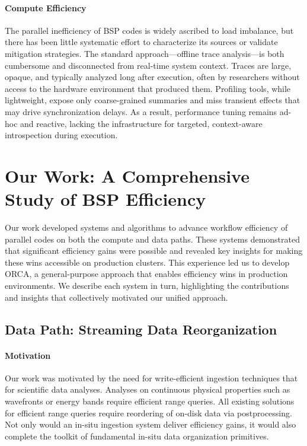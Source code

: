 \paragraph{Compute Efficiency}
The parallel inefficiency of BSP codes is widely ascribed to load imbalance, but there has been
little systematic effort to characterize its sources or validate mitigation strategies.
The standard approach—offline trace analysis—is both cumbersome and disconnected from real-time
system context.
Traces are large, opaque, and typically analyzed long after execution, often by researchers without
access to the hardware environment that produced them.
Profiling tools, while lightweight, expose only coarse-grained summaries and miss transient effects
that may drive synchronization delays.
As a result, performance tuning remains ad-hoc and reactive, lacking the infrastructure for
targeted, context-aware introspection during execution.

\section{Our Work: A Comprehensive Study of BSP Efficiency}

Our work developed systems and algorithms to advance workflow efficiency of parallel codes on both
the compute and data paths.
These systems demonstrated that significant efficiency gains were possible and revealed key
insights for making these wins accessible on production clusters.
This experience led us to develop ORCA, a general-purpose approach that enables efficiency wins in
production environments.
We describe each system in turn, highlighting the contributions and insights that collectively
motivated our unified approach.

\subsection{Data Path: Streaming Data Reorganization}

\paragraph{Motivation}
Our work was motivated by the need for write-efficient ingestion techniques that for scientific
data analyses.
Analyses on continuous physical properties such as wavefronts or energy bands require efficient
range queries.
All existing solutions for efficient range queries require reordering of on-disk data via
postprocessing.
Not only would an in-situ ingestion system deliver efficiency gains, it would also complete the
toolkit of fundamental in-situ data organization primitives.

